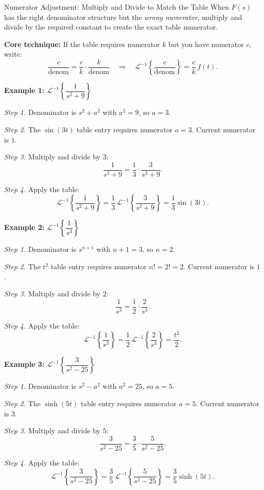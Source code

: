 \documentclass[12pt,a4paper]{article}
\begin{document}
\begin{infobox}{Numerator Adjustment: Multiply and Divide to Match the Table}
When $F(s)$ has the right denominator structure but the \emph{wrong numerator}, multiply
and divide by the required constant to create the exact table numerator.

\medskip
\textbf{Core technique:} If the table requires numerator $k$ but you have numerator $c$,
write:
\[
  \frac{c}{\text{denom}} = \frac{c}{k} \cdot \frac{k}{\text{denom}}
  \quad\Longrightarrow\quad
  \mathcal{L}^{-1}\left\{\frac{c}{\text{denom}}\right\} = \frac{c}{k}\,f(t).
\]

\medskip
\textbf{Example 1:} $\mathcal{L}^{-1}\left\{\dfrac{1}{s^2+9}\right\}$

\textit{Step 1.} Denominator is $s^2 + a^2$ with $a^2 = 9$, so $a = 3$.

\textit{Step 2.} The $\sin(3t)$ table entry requires numerator $a = 3$.
Current numerator is $1$.

\textit{Step 3.} Multiply and divide by $3$:
\[
  \frac{1}{s^2+9} = \frac{1}{3}\cdot\frac{3}{s^2+9}.
\]

\textit{Step 4.} Apply the table:
\[
  \mathcal{L}^{-1}\left\{\frac{1}{s^2+9}\right\}
  = \frac{1}{3}\,\mathcal{L}^{-1}\left\{\frac{3}{s^2+9}\right\}
  = \frac{1}{3}\sin(3t).
\]

\medskip
\textbf{Example 2:} $\mathcal{L}^{-1}\left\{\dfrac{1}{s^3}\right\}$

\textit{Step 1.} Denominator is $s^{n+1}$ with $n+1 = 3$, so $n = 2$.

\textit{Step 2.} The $t^2$ table entry requires numerator $n! = 2! = 2$.
Current numerator is $1$.

\textit{Step 3.} Multiply and divide by $2$:
\[
  \frac{1}{s^3} = \frac{1}{2}\cdot\frac{2}{s^3}.
\]

\textit{Step 4.} Apply the table:
\[
  \mathcal{L}^{-1}\left\{\frac{1}{s^3}\right\}
  = \frac{1}{2}\,\mathcal{L}^{-1}\left\{\frac{2}{s^3}\right\}
  = \frac{t^2}{2}.
\]

\medskip
\textbf{Example 3:} $\mathcal{L}^{-1}\left\{\dfrac{3}{s^2-25}\right\}$

\textit{Step 1.} Denominator is $s^2 - a^2$ with $a^2 = 25$, so $a = 5$.

\textit{Step 2.} The $\sinh(5t)$ table entry requires numerator $a = 5$.
Current numerator is $3$.

\textit{Step 3.} Multiply and divide by $5$:
\[
  \frac{3}{s^2-25} = \frac{3}{5}\cdot\frac{5}{s^2-25}.
\]

\textit{Step 4.} Apply the table:
\[
  \mathcal{L}^{-1}\left\{\frac{3}{s^2-25}\right\}
  = \frac{3}{5}\,\mathcal{L}^{-1}\left\{\frac{5}{s^2-25}\right\}
  = \frac{3}{5}\sinh(5t).
\]
\end{infobox}
\end{document}
